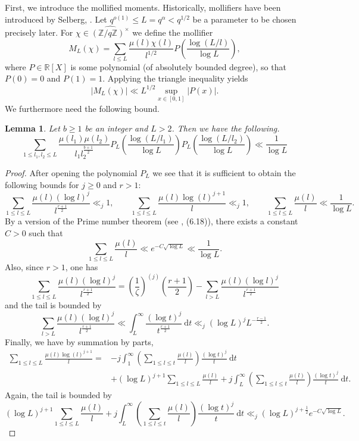 \documentclass[12pt]{amsart}
\theoremstyle{plain}
\newtheorem{lem}[thm]{Lemma}
\theoremstyle{definition}
\theoremstyle{remark}
\numberwithin{equation}{section}
\newcommand{\RR}{\mathbb{R}}
\newcommand{\ZZ}{\mathbb{Z}}
\renewcommand{\geq}{\geqslant}
\renewcommand{\leq}{\leqslant}
\begin{document}
First, we introduce the mollified moments. Historically, mollifiers have been introduced by Selberg, \cite{Selberg1942}.
Let $q^{o(1)}\leq L=q^\alpha< q^{1/2}$ be a parameter to be chosen precisely later. For $\chi \in \widehat{(\ZZ/q\ZZ)^{\times}}$ we define the mollifier 
\[M_L(\chi) = \sum_{l\leq L}\frac{\mu(l)\chi(l)}{l^{1/2}}P\left(\frac{\log (L/l)}{\log L}\right),\]
where $P\in \RR[X]$ is some polynomial (of absolutely bounded degree), so that $P(0) = 0$ and $P(1) = 1$.
Applying the triangle inequality yields \begin{equation}\label{eq: trivial bound mollifier}
    \vert{M_L(\chi)}\vert \ll L^{1/2} \sup_{x\in [0,1]}\vert{P(x)}\vert.
\end{equation}
We furthermore need the following bound. 

\begin{lem}\label{lem: bound for a=1, with mollifier} Let $b\geq 1$ be an integer and $L>2$. Then we have the following.
\[\sum_{1\leq l_1,l_2\leq L}\frac{\mu(l_1)\mu(l_2)}{l_1l_2^{\frac{b+1}{2}}}P_L\left(\frac{\log(L/l_1)}{\log L}\right)P_L\left(\frac{\log(L/l_2)}{\log L}\right) \ll \frac{1}{\log L} \] 
\end{lem}
\begin{proof}
    After opening the polynomial $P_L$ we see that it is sufficient to obtain the following bounds for $j\geq 0$ and $r>1$:
    \begin{equation*}
        \sum_{1\leq l\leq L}\frac{\mu(l)(\log l)^j}{l^{\frac{r+1}{2}}} \ll_j 1, \qquad \sum_{1\leq l\leq L}\frac{\mu(l)\log(l)^{j+1}}{l} \ll_j 1, \qquad \sum_{1\leq l\leq L}\frac{\mu(l)}{l} \ll \frac{1}{\log L}.
    \end{equation*}
    By a version of the Prime number theorem (see  \cite{Montgomery_Vaughan_2006}, (6.18)), there exists a constant $C>0$ such that 
    \[\sum_{1\leq l\leq L}\frac{\mu(l)}{l} \ll e^{-C\sqrt{\log L}} \ll \frac{1}{\log L}.\]
    Also, since $r>1$, one has 
    \[\sum_{1\leq l\leq L}\frac{\mu(l)(\log l)^j}{l^{\frac{r+1}{2}}} = \left(\frac{1}{\zeta}\right)^{(j)}\left(\frac{r+1}{2}\right)- \sum_{l>L}\frac{\mu(l)(\log l)^j}{l^{\frac{r+1}{2}}} \]
    and the tail is bounded by 
    \[\sum_{l>L}\frac{\mu(l)(\log l)^j}{l^{\frac{r+1}{2}}} \ll \int_{L}^{\infty}\frac{(\log t)^j}{t^{\frac{r+1}{2}}} \ \mathrm{d}t \ll_j (\log L)^jL^{-\frac{r-1}{2}}.\]
    Finally, we have by summation by parts,
    \begin{align*}\sum_{1\leq l\leq L}\frac{\mu(l)\log(l)^{j+1}}{l} =& -j\int_{1}^{\infty}\left(\sum_{1\leq l\leq t}\frac{\mu(l)}{l}\right)\frac{(\log t)^j}{t} \ \mathrm{d}t  \\ & + (\log L)^{j+1}\sum_{1\leq l\leq L}\frac{\mu(l)}{l} + j\int_{L}^{\infty}\left(\sum_{1\leq l\leq t}\frac{\mu(l)}{l}\right)\frac{(\log t)^j}{t} \ \mathrm{d}t.\end{align*}
    Again, the tail is bounded by \[(\log L)^{j+1}\sum_{1\leq l\leq L}\frac{\mu(l)}{l} + j\int_{L}^{\infty}\left(\sum_{1\leq l\leq t}\frac{\mu(l)}{l}\right)\frac{(\log t)^j}{t} \ \mathrm{d}t\ll_j (\log L)^{j+\frac{1}{2}}e^{-C\sqrt{\log L}}.\] 
\end{proof}
\end{document}
